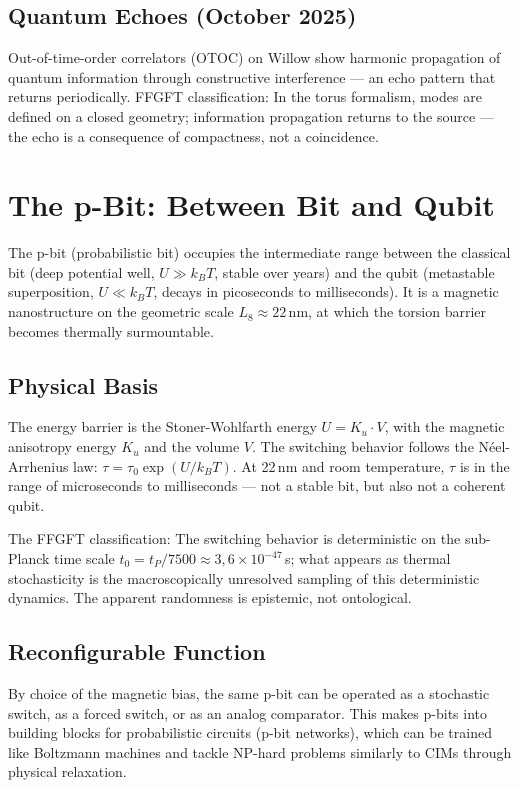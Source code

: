 \subsection*{Quantum Echoes (October 2025)}

Out-of-time-order correlators (OTOC) on Willow show harmonic
propagation of quantum information through constructive interference --- an
echo pattern that returns periodically. FFGFT classification: In the
torus formalism, modes are defined on a closed geometry;
information propagation returns to the source --- the echo
is a consequence of compactness, not a coincidence.

\section{The p-Bit: Between Bit and Qubit}

The p-bit (probabilistic bit) occupies the intermediate range between
the classical bit (deep potential well, $U\gg k_BT$, stable over
years) and the qubit (metastable superposition, $U\ll k_BT$, decays in
picoseconds to milliseconds). It is a magnetic nanostructure on
the geometric scale $L_8\approx22$\,nm, at which the torsion barrier
becomes thermally surmountable.

\subsection*{Physical Basis}

The energy barrier is the Stoner-Wohlfarth energy $U = K_u\cdot V$,
with the magnetic anisotropy energy $K_u$ and the volume $V$. The
switching behavior follows the Néel-Arrhenius law:
$\tau = \tau_0\exp(U/k_BT)$. At 22\,nm and room temperature, $\tau$
is in the range of microseconds to milliseconds --- not a stable bit,
but also not a coherent qubit.

The FFGFT classification: The switching behavior is deterministic on the
sub-Planck time scale $t_0 = t_P/7500\approx3{,}6\times10^{-47}$\,s;
what appears as thermal stochasticity is the macroscopically
unresolved sampling of this deterministic dynamics. The apparent
randomness is epistemic, not ontological.

\subsection*{Reconfigurable Function}

By choice of the magnetic bias, the same p-bit can be operated as a
stochastic switch, as a forced switch, or as an analog comparator. This makes p-bits into building blocks for
probabilistic circuits (p-bit networks), which can be trained like Boltzmann
machines and tackle NP-hard problems similarly to CIMs
through physical relaxation.

